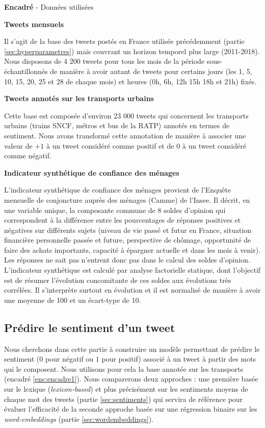\documentclass[11pt,french,french]{article}
\newcounter{comptEncadre}
\renewcommand\thecomptEncadre{%
\arabic{comptEncadre}}
\newenvironment{encadre}[2][false]{\refstepcounter{comptEncadre}
\begin{bclogo}[couleur=processblue!5,arrondi=0.1,
logo=\bcloupe,barre=none,couleurBord=blue!60!green,nobreak = #1]{ {\sc \textbf{Encadré \thecomptEncadre}} -  #2}
\smallskip
}{\end{bclogo}}
\begin{document}
\begin{encadre}[true]{Données utilisées}\label{enc:encadre1}

\small

\textbf{Tweets mensuels}

Il s'agit de la base des tweets postés en France utilisée précédemment (partie  \ref{sec:hyperparametres}) mais couvrant un horizon temporel plus large (2011-2018).
Nous disposons de 4 200 tweets pour tous les mois de la période sous-échantillonnés de manière à avoir autant de tweets pour certains jours (les 1, 5, 10, 15, 20, 25 et 28 de chaque mois) et heures (0h, 6h, 12h 15h 18h et 21h) fixés. 

\textbf{Tweets annotés sur les transports urbains}

Cette base est composée d'environ 23 000 tweets qui concernent les transports urbains (trains SNCF, métros et bus de la RATP) annotés en termes de sentiment.
Nous avons transformé cette annotation de manière à associer une valeur de $+1$ à un tweet considéré comme positif et de $0$ à un tweet considéré comme négatif.


\textbf{Indicateur synthétique de confiance des ménages}

L’indicateur synthétique de confiance des ménages provient de l'Enquête mensuelle de conjoncture auprès des ménages (Camme) de l’Insee.
Il décrit, en une variable unique, la composante commune de 8 soldes d’opinion qui correspondent à la différence entre les pourcentages de réponses positives et négatives sur différents sujets (niveau de vie passé et futur en France, situation financière personnelle passée et future, perspective de chômage, opportunité de faire des achats importants, capacité à épargner actuelle et dans les mois à venir). Les réponses \og ne sait pas \fg n'entrent donc pas dans le calcul des soldes d'opinion.
L'indicateur synthétique est calculé par analyse factorielle statique, dont l’objectif est de résumer l’évolution concomitante de ces soldes aux évolutions très corrélées.
Il s’interprète surtout en évolution et il est normalisé de manière à avoir une moyenne de 100 et un écart-type de 10. 

\end{encadre}

\subsection{Prédire le sentiment d'un
tweet}\label{pruxe9dire-le-sentiment-dun-tweet}

Nous cherchons dans cette partie à construire un modèle permettant de
prédire le sentiment (\(0\) pour négatif ou \(1\) pour positif) associé
à un tweet à partir des mots qui le composent. Nous utilisons pour cela
la base annotée sur les transports (encadré \ref{enc:encadre1}). Nous
comparerons deux approches : une première basée sur le lexique
(\emph{lexicon-based}) et plus précisément sur les sentiments moyens de
chaque mot des tweets (partie \ref{sec:sentiments}) qui servira de
référence pour évaluer l'efficacité de la seconde approche basée sur une
régression binaire sur les \emph{word-embeddings} (partie
\ref{sec:wordembeddings}).
\end{document}
